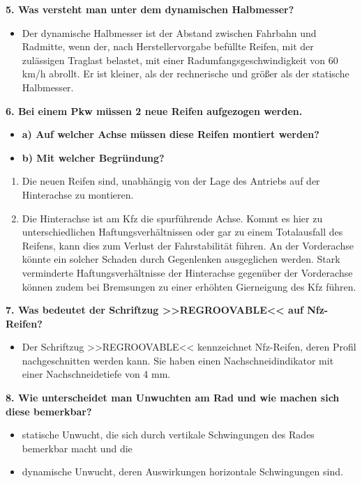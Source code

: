 \textbf{5. Was versteht man unter dem dynamischen Halbmesser?}

\begin{itemize}
\item
  Der dynamische Halbmesser ist der Abstand zwischen Fahrbahn und
  Radmitte, wenn der, nach Herstellervorgabe befüllte Reifen, mit der
  zulässigen Traglast belastet, mit einer Radumfangsgeschwindigkeit von
  60 km/h abrollt. Er ist kleiner, als der rechnerische und größer als
  der statische Halbmesser.
\end{itemize}

\textbf{6. Bei einem Pkw müssen 2 neue Reifen aufgezogen werden.}

\begin{itemize}
\item
  \textbf{a) Auf welcher Achse müssen diese Reifen montiert werden?}
\item
  \textbf{b) Mit welcher Begründung?}
\end{itemize}

\begin{enumerate}
\def\labelenumi{\alph{enumi})}
\item
  Die neuen Reifen sind, unabhängig von der Lage des Antriebs auf der
  Hinterachse zu montieren.
\item
  Die Hinterachse ist am Kfz die spurführende Achse. Kommt es hier zu
  unterschiedlichen Haftungsverhältnissen oder gar zu einem Totalausfall
  des Reifens, kann dies zum Verlust der Fahrstabilität führen. An der
  Vorderachse könnte ein solcher Schaden durch Gegenlenken ausgeglichen
  werden. Stark verminderte Haftungsverhältnisse der Hinterachse
  gegenüber der Vorderachse können zudem bei Bremsungen zu einer
  erhöhten Gierneigung des Kfz führen.
\end{enumerate}

\textbf{7. Was bedeutet der Schriftzug >>REGROOVABLE<< auf Nfz-Reifen?}

\begin{itemize}
\item
  Der Schriftzug >>REGROOVABLE<< kennzeichnet Nfz-Reifen, deren Profil
  nachgeschnitten werden kann. Sie haben einen Nachschneidindikator mit
  einer Nachschneidetiefe von 4 mm.
\end{itemize}

\textbf{8. Wie unterscheidet man Unwuchten am Rad und wie machen sich
diese bemerkbar?}

\begin{itemize}
\item
  statische Unwucht, die sich durch vertikale Schwingungen des Rades
  bemerkbar macht und die
\item
  dynamische Unwucht, deren Auswirkungen horizontale Schwingungen sind.
\end{itemize}

